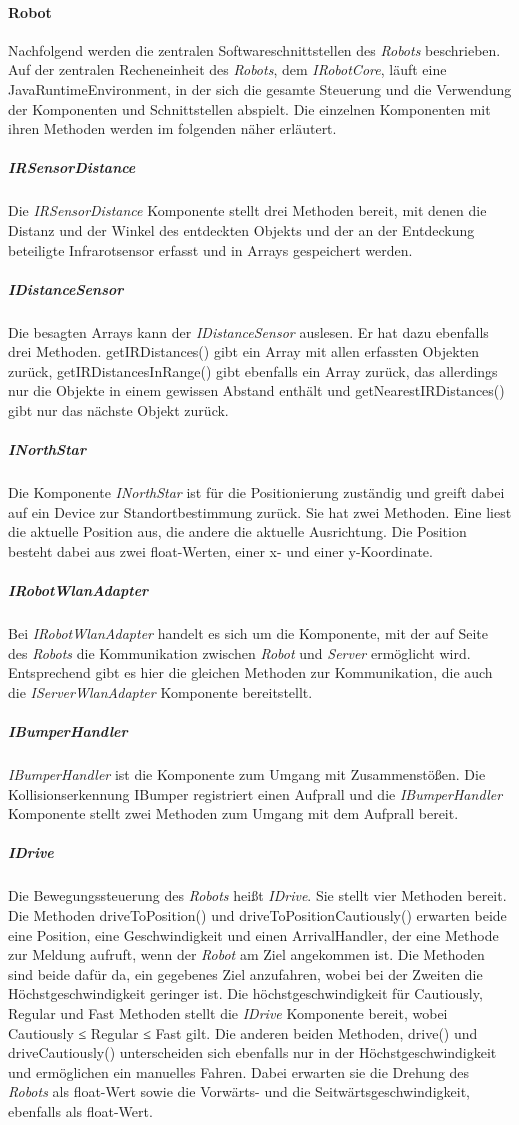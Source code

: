     \paragraph{Robot}\label{robot}
    		Nachfolgend werden die zentralen Softwareschnittstellen des \emph{Robots} beschrieben.
    	\label{irobotcore}
    		Auf der zentralen Recheneinheit des \emph{Robots}, dem \emph{IRobotCore}, läuft eine JavaRuntimeEnvironment, in der sich die gesamte Steuerung und die Verwendung der Komponenten und Schnittstellen abspielt. Die einzelnen Komponenten mit ihren Methoden werden im folgenden näher erläutert.
    	\subparagraph{IRSensorDistance}\label{irsensordistance}
    		Die \emph{IRSensorDistance} Komponente stellt drei Methoden bereit, mit denen die Distanz und der Winkel des entdeckten Objekts und der an der Entdeckung beteiligte Infrarotsensor erfasst und in Arrays gespeichert werden.
    	\subparagraph{IDistanceSensor}\label{idistancesensor}
    		Die besagten Arrays kann der \emph{IDistanceSensor} auslesen. Er hat dazu ebenfalls drei Methoden. getIRDistances() gibt ein Array mit allen erfassten Objekten zurück, getIRDistancesInRange() gibt ebenfalls ein Array zurück, das allerdings nur die Objekte in einem gewissen Abstand enthält und getNearestIRDistances() gibt nur das nächste Objekt zurück.
    	\subparagraph{INorthStar}\label{inorthstar}
    		Die Komponente \emph{INorthStar} ist für die Positionierung zuständig und greift dabei auf ein Device zur Standortbestimmung zurück. Sie hat zwei Methoden. Eine liest die aktuelle Position aus, die andere die aktuelle Ausrichtung. Die Position besteht dabei aus zwei float-Werten, einer x- und einer y-Koordinate.
    	\subparagraph{IRobotWlanAdapter}\label{irobotwlanadapter}
    		Bei \emph{IRobotWlanAdapter} handelt es sich um die Komponente, mit der auf Seite des \emph{Robots} die Kommunikation zwischen \emph{Robot} und \emph{Server} ermöglicht wird. Entsprechend gibt es hier die gleichen Methoden zur Kommunikation, die auch die \emph{IServerWlanAdapter} Komponente bereitstellt.
    	\subparagraph{IBumperHandler}\label{ibumperhandler}
    		\emph{IBumperHandler} ist die Komponente zum Umgang mit Zusammenstößen. Die Kollisionserkennung IBumper registriert einen Aufprall und die \emph{IBumperHandler} Komponente stellt zwei Methoden zum Umgang mit dem Aufprall bereit.
    	\subparagraph{IDrive}\label{idrive}
    		Die Bewegungssteuerung des \emph{Robots} heißt \emph{IDrive}. Sie stellt vier Methoden bereit. Die Methoden driveToPosition() und driveToPositionCautiously() erwarten beide eine Position, eine Geschwindigkeit und einen ArrivalHandler, der eine Methode zur Meldung aufruft, wenn der \emph{Robot} am Ziel angekommen ist. Die Methoden sind beide dafür da, ein gegebenes Ziel anzufahren, wobei bei der Zweiten die Höchstgeschwindigkeit geringer ist. Die höchstgeschwindigkeit für Cautiously, Regular und Fast Methoden stellt die \emph{IDrive} Komponente bereit, wobei Cautiously ≤ Regular ≤ Fast gilt. Die anderen beiden Methoden, drive() und driveCautiously() unterscheiden sich ebenfalls nur in der Höchstgeschwindigkeit und ermöglichen ein manuelles Fahren. Dabei erwarten sie die Drehung des \emph{Robots} als float-Wert sowie die Vorwärts- und die Seitwärtsgeschwindigkeit, ebenfalls als float-Wert.
